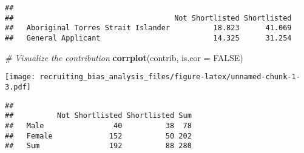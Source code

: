 \documentclass[]{article}
\newenvironment{Shaded}{\begin{snugshade}}{\end{snugshade}}
\newcommand{\KeywordTok}[1]{\textcolor[rgb]{0.13,0.29,0.53}{\textbf{#1}}}
\newcommand{\DataTypeTok}[1]{\textcolor[rgb]{0.13,0.29,0.53}{#1}}
\newcommand{\DecValTok}[1]{\textcolor[rgb]{0.00,0.00,0.81}{#1}}
\newcommand{\StringTok}[1]{\textcolor[rgb]{0.31,0.60,0.02}{#1}}
\newcommand{\CommentTok}[1]{\textcolor[rgb]{0.56,0.35,0.01}{\textit{#1}}}
\newcommand{\OtherTok}[1]{\textcolor[rgb]{0.56,0.35,0.01}{#1}}
\newcommand{\OperatorTok}[1]{\textcolor[rgb]{0.81,0.36,0.00}{\textbf{#1}}}
\newcommand{\NormalTok}[1]{#1}
\begin{document}
\begin{Shaded}
\end{Shaded}

\begin{verbatim}
##                                    
##                                     Not Shortlisted Shortlisted
##   Aboriginal Torres Strait Islander          18.823      41.069
##   General Applicant                          14.325      31.254
\end{verbatim}

\begin{Shaded}
\begin{Highlighting}[]
\CommentTok{# Visualize the contribution}
\KeywordTok{corrplot}\NormalTok{(contrib, }\DataTypeTok{is.cor =} \OtherTok{FALSE}\NormalTok{)}
\end{Highlighting}
\end{Shaded}

\texttt{[image: recruiting\_bias\_analysis\_files/figure-latex/unnamed-chunk-1-3.pdf]}

\begin{Shaded}
\end{Shaded}

\begin{verbatim}
##         
##          Not Shortlisted Shortlisted Sum
##   Male                40          38  78
##   Female             152          50 202
##   Sum                192          88 280
\end{verbatim}
\end{document}

